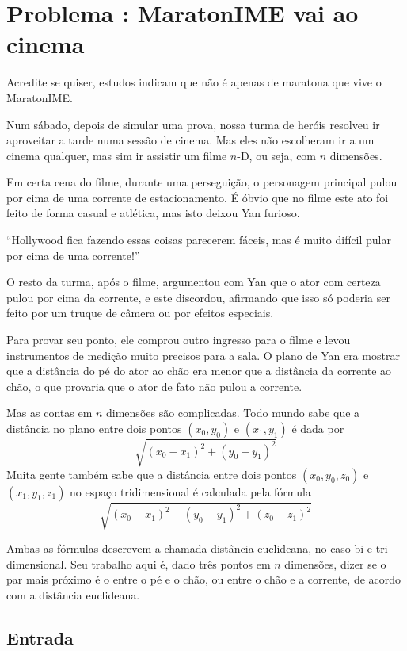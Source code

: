 \section*{Problema \proxLetra: MaratonIME vai ao cinema}

Acredite se quiser, estudos indicam que não é apenas de maratona que vive o MaratonIME. 

Num sábado, depois de simular uma prova, nossa turma de heróis resolveu ir aproveitar
a tarde numa sessão de cinema. Mas eles não escolheram ir a um cinema qualquer, mas sim
ir assistir um filme $n$-D, ou seja, com $n$ dimensões.

Em certa cena do filme, durante uma perseguição, o personagem principal pulou por cima
de uma corrente de estacionamento. É óbvio que no filme este ato foi feito de forma 
casual e atlética, mas isto deixou Yan furioso.

``Hollywood fica fazendo essas coisas parecerem fáceis, mas é muito difícil pular por
cima de uma corrente!''

O resto da turma, após o filme, argumentou com Yan que o ator com certeza pulou por cima
da corrente, e este discordou, afirmando que isso só poderia ser feito por um truque de 
câmera ou por efeitos especiais.

Para provar seu ponto, ele comprou outro ingresso para o filme e levou instrumentos de
medição muito precisos para a sala. O plano de Yan era mostrar que a distância do pé do
ator ao chão era menor que a distância da corrente ao chão, o que provaria que o ator
de fato não pulou a corrente.

Mas as contas em $n$ dimensões são complicadas. Todo mundo sabe que a distância no plano
entre dois pontos $(x_0,y_0)$ e  $(x_1,y_1)$ é dada por
\[ \sqrt{(x_0-x_1)^2 + (y_0-y_1)^2}\]
Muita gente também sabe que a distância entre dois pontos $(x_0,y_0,z_0)$ e $(x_1,y_1,z_1)$
no espaço tridimensional é calculada pela fórmula
\[\sqrt{(x_0-x_1)^2 + (y_0-y_1)^2 + (z_0-z_1)^2}\]

Ambas as fórmulas descrevem a chamada distância euclideana, no caso bi e tri-dimensional.
Seu trabalho aqui é, dado três pontos em $n$ dimensões, dizer se o par mais próximo é o
entre o pé e o chão, ou entre o chão e a corrente, de acordo com a distância euclideana.

\subsection*{Entrada}

